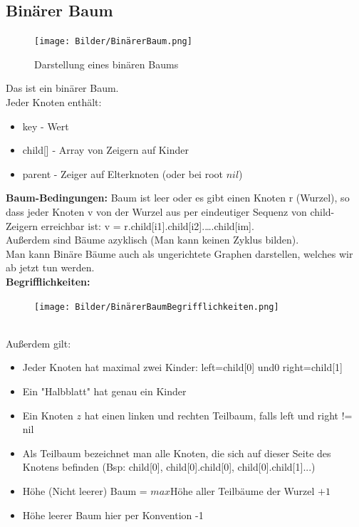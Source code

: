 \documentclass{article}
\begin{document}
        \subsection{Binärer Baum}
            \begin{figure}[ht]
                \centering
                \texttt{[image: Bilder/BinärerBaum.png]}
                \caption{Darstellung eines binären Baums}
                \label{fig:BinaererBaum}
            \end{figure}
            Das ist ein binärer Baum.\\
            Jeder Knoten enthält:
            \begin{itemize}
                \item key - Wert
                \item child[] - Array von Zeigern auf Kinder
                \item parent - Zeiger auf Elterknoten (oder bei root $nil$)
            \end{itemize}
            \textbf{Baum-Bedingungen:} Baum ist leer oder es gibt einen Knoten r (Wurzel), so dass jeder Knoten v von der Wurzel aus per eindeutiger Sequenz von child-Zeigern erreichbar ist: v = r.child[i1].child[i2].….child[im]. \\
            Außerdem sind Bäume azyklisch (Man kann keinen Zyklus bilden). \\
            Man kann Binäre Bäume auch als ungerichtete Graphen darstellen, welches wir ab jetzt tun werden.\\
            \textbf{Begrifflichkeiten:}
            \begin{figure}[ht]
                \centering
                \texttt{[image: Bilder/BinärerBaumBegrifflichkeiten.png]}
                \label{fig:BinaererBaumBegrifflichkeiten}
            \end{figure}\\
            Außerdem gilt:
            \begin{itemize}
                \item Jeder Knoten hat maximal zwei Kinder: left=child[0] und0 right=child[1]
                \item Ein "Halbblatt" hat genau ein Kinder
                \item Ein Knoten $z$ hat einen linken und rechten Teilbaum, falls left und right != nil
                \item Als Teilbaum bezeichnet man alle Knoten, die sich auf dieser Seite des Knotens befinden (Bsp: child[0], child[0].child[0], child[0].child[1]...)
                \item Höhe (Nicht leerer) Baum = $max${Höhe aller Teilbäume der Wurzel }$ +1$
                \item Höhe leerer Baum hier per Konvention -1
            \end{itemize}
\end{document}
